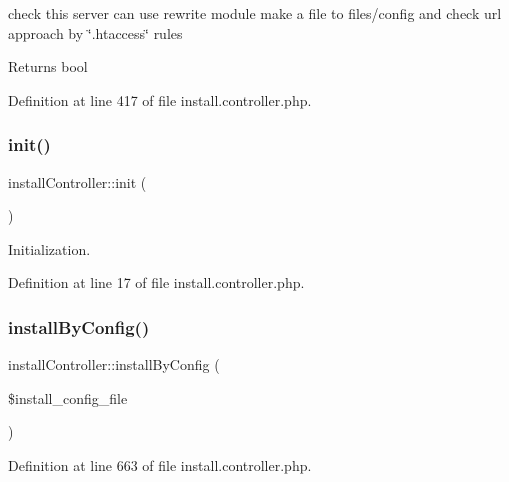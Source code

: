check this server can use rewrite module make a file to files/config and check url approach by \char`\"{}.\+htaccess\char`\"{} rules

\begin{DoxyReturn}{Returns}
bool 
\end{DoxyReturn}


Definition at line 417 of file install.\+controller.\+php.

\mbox{\label{classinstallController_a99641d12063ae41f5a787ac159853c83}} 
\subsubsection{\texorpdfstring{init()}{init()}}
{\footnotesize\ttfamily install\+Controller\+::init (\begin{DoxyParamCaption}{ }\end{DoxyParamCaption})}



Initialization. 



Definition at line 17 of file install.\+controller.\+php.

\mbox{\label{classinstallController_a4ec44b3090b73660ba018945c2ffa239}} 
\subsubsection{\texorpdfstring{install\+By\+Config()}{installByConfig()}}
{\footnotesize\ttfamily install\+Controller\+::install\+By\+Config (\begin{DoxyParamCaption}\item[{}]{\$install\+\_\+config\+\_\+file }\end{DoxyParamCaption})}



Definition at line 663 of file install.\+controller.\+php.

\mbox{\label{classinstallController_ad7919cd4745794ee4f57db53e8105190}} 
